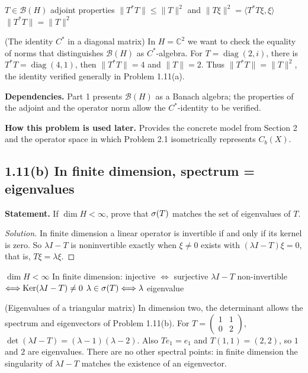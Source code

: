 \proofdiagram
{$T\in\mathcal B(H)$}
{adjoint properties}
{$\|T^*T\|\le\|T\|^2$ and $\|T\xi\|^2=\langle T^*T\xi,\xi\rangle$}
{$\|T^*T\|=\|T\|^2$}

\begin{cthejemplo}{(The identity $C^*$ in a diagonal matrix)}
In $H=\mathbb C^2$ we want to check the equality of norms that distinguishes
$\mathcal B(H)$ as $C^*$-algebra.
For $T=\operatorname{diag}(2,i)$, there is
$T^*T=\operatorname{diag}(4,1)$, then $\|T^*T\|=4$ and $\|T\|=2$.
Thus $\|T^*T\|=\|T\|^2$, the identity verified generally in Problem 1.11(a).
\end{cthejemplo}

\noindent\textbf{Dependencies.} Part 1 presents $\mathcal B(H)$ as a Banach algebra; the properties of the adjoint and the operator norm allow the $C^*$-identity to be verified.

\noindent\textbf{How this problem is used later.} Provides the concrete model from Section 2 and the operator space in which Problem 2.1 isometrically represents $C_b(X)$.

\subsection*{1.11(b) In finite dimension, spectrum = eigenvalues}

\noindent\textbf{Statement.} If $\dim H<\infty$, prove that $\sigma(T)$ matches the set of eigenvalues of $T$.

\begin{proof}[Solution]
In finite dimension a linear operator is invertible if and only if its kernel is zero. So
$\lambda I-T$ is noninvertible exactly when $\xi\neq0$ exists with
$(\lambda I-T)\xi=0$, that is, $T\xi=\lambda\xi$.
\end{proof}

\proofdiagram
{$\dim H<\infty$}
{In finite dimension: injective $\Longleftrightarrow$ surjective}
{$\lambda I-T$ non-invertible $\Longleftrightarrow\operatorname{Ker}(\lambda I-T)\neq0$}
{$\lambda\in\sigma(T)\Longleftrightarrow\lambda$ eigenvalue}

\begin{cthejemplo}{(Eigenvalues of a triangular matrix)}
In dimension two, the determinant allows the spectrum and
eigenvectors of Problem 1.11(b).
For $T=\begin{pmatrix}1&1\\0&2\end{pmatrix}$,
$\det(\lambda I-T)=(\lambda-1)(\lambda-2)$.
Also $Te_1=e_1$ and $T(1,1)=(2,2)$, so $1$ and $2$ are eigenvalues.
There are no other spectral points: in finite dimension the singularity of $\lambda I-T$
matches the existence of an eigenvector.
\end{cthejemplo}

